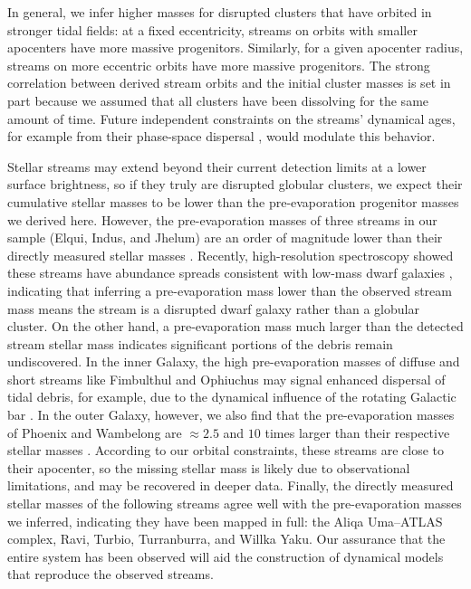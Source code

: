 \documentclass[twocolumn]{aastex63}
\begin{document}
In general, we infer higher masses for disrupted clusters that have orbited in stronger tidal fields: at a fixed eccentricity, streams on orbits with smaller apocenters have more massive progenitors.
Similarly, for a given apocenter radius, streams on more eccentric orbits have more massive progenitors.
The strong correlation between derived stream orbits and the initial cluster masses is set in part because we assumed that all clusters have been dissolving for the same amount of time.
Future independent constraints on the streams' dynamical ages, for example from their phase-space dispersal \citep{buckley:2019},  would modulate this behavior.

Stellar streams may extend beyond their current detection limits at a lower surface brightness, so if they truly are disrupted globular clusters, we expect their cumulative stellar masses to be lower than the pre-evaporation progenitor masses we derived here.
However, the pre-evaporation masses of three streams in our sample (Elqui, Indus, and Jhelum) are an order of magnitude lower than their directly measured stellar masses \citep{shipp:2018}.
Recently, high-resolution spectroscopy showed these streams have abundance spreads consistent with low-mass dwarf galaxies \citep{ji:2020}, indicating that inferring a pre-evaporation mass lower than the observed stream mass means the stream is a disrupted dwarf galaxy rather than a globular cluster.
On the other hand, a pre-evaporation mass much larger than the detected stream stellar mass indicates significant portions of the debris remain undiscovered.
In the inner Galaxy, the high pre-evaporation masses of diffuse and short streams like Fimbulthul and Ophiuchus may signal enhanced dispersal of tidal debris, for example, due to the dynamical influence of the rotating Galactic bar \citep{hattori:2016, price-whelan:2016}.
In the outer Galaxy, however, we also find that the pre-evaporation masses of Phoenix and Wambelong are $\approx2.5$ and $10$ times larger than their respective stellar masses \citep{shipp:2018}.
According to our orbital constraints, these streams are close to their apocenter, so the missing stellar mass is likely due to observational limitations, and may be recovered in deeper data.
Finally, the directly measured stellar masses of the following streams agree well with the pre-evaporation masses we inferred, indicating they have been mapped in full: the Aliqa Uma--ATLAS complex, Ravi, Turbio, Turranburra, and Willka Yaku.
Our assurance that the entire system has been observed will aid the construction of dynamical models that reproduce the observed streams.
\end{document}
